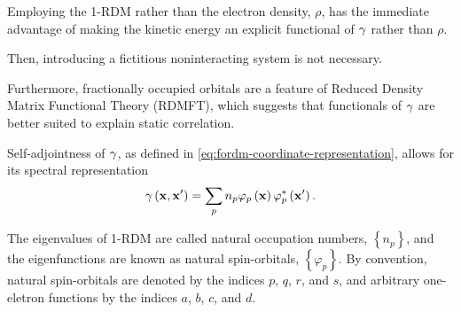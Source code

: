 
Employing the 1-RDM rather than the electron density, $\rho$, has the immediate
advantage of making the kinetic energy an explicit functional of $\gamma$ rather
than $\rho$.

Then, introducing a fictitious noninteracting system is not necessary.

Furthermore, fractionally occupied orbitals are a feature of Reduced Density 
Matrix Functional Theory (RDMFT), which suggests that functionals of $\gamma$ are 
better suited to explain static correlation.

Self-adjointness of $\gamma$, as defined in \cref{eq:fordm-coordinate-representation},
allows for its spectral representation
\begin{equation}
    \gamma \left( \boldsymbol{\mathrm{x}}, \boldsymbol{\mathrm{x}}^{\prime} \right) =
    \sum_{p} n_p 
    \varphi_p \left( \boldsymbol{\mathrm{x}} \right)
    \varphi_p^{*} \left( \boldsymbol{\mathrm{x}}^{\prime} \right)
    .
\end{equation}

The eigenvalues of 1-RDM are called natural occupation numbers,
$\left\{ n_p \right\}$, and the eigenfunctions are known as natural
spin-orbitals, $\left\{ \varphi_p \right\}$.
By convention, natural spin-orbitals are denoted by the indices $p$, $q$, $r$, and $s$, 
and arbitrary one-eletron functions by the indices $a$, $b$, $c$, and $d$. 

